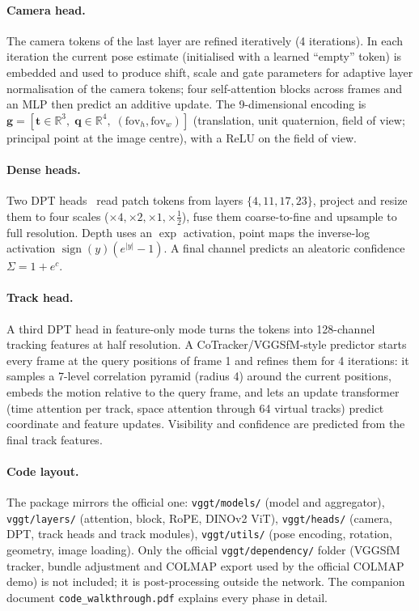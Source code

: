 \documentclass[11pt,a4paper]{article}
\begin{document}
\paragraph{Camera head.} The camera tokens of the last layer are refined iteratively (4 iterations). In each iteration the
current pose estimate (initialised with a learned ``empty'' token) is embedded and used to produce shift, scale and gate
parameters for adaptive layer normalisation of the camera tokens; four self-attention blocks across frames and an MLP
then predict an additive update. The 9-dimensional encoding is
$\mathbf{g} = [\mathbf{t}\in\mathbb{R}^3,\; \mathbf{q}\in\mathbb{R}^4,\; (\text{fov}_h, \text{fov}_w)]$ (translation,
unit quaternion, field of view; principal point at the image centre), with a ReLU on the field of view.

\paragraph{Dense heads.} Two DPT heads~\cite{dpt} read patch tokens from layers $\{4, 11, 17, 23\}$, project and resize them to
four scales ($\times4, \times2, \times1, \times\tfrac12$), fuse them coarse-to-fine and upsample to full resolution. Depth uses
an $\exp$ activation, point maps the inverse-log activation $\operatorname{sign}(y)(e^{|y|}-1)$. A final channel predicts an
aleatoric confidence $\Sigma = 1 + e^{c}$.

\paragraph{Track head.} A third DPT head in feature-only mode turns the tokens into 128-channel tracking features at half
resolution. A CoTracker/VGGSfM-style predictor starts every frame at the query positions of frame 1 and refines them for 4
iterations: it samples a 7-level correlation pyramid (radius 4) around the current positions, embeds the motion relative to
the query frame, and lets an update transformer (time attention per track, space attention through 64 virtual tracks) predict
coordinate and feature updates. Visibility and confidence are predicted from the final track features.

\paragraph{Code layout.} The package mirrors the official one: \texttt{vggt/models/} (model and aggregator),
\texttt{vggt/layers/} (attention, block, RoPE, DINOv2 ViT), \texttt{vggt/heads/} (camera, DPT, track heads and track modules),
\texttt{vggt/utils/} (pose encoding, rotation, geometry, image loading). Only the official \texttt{vggt/dependency/} folder
(VGGSfM tracker, bundle adjustment and COLMAP export used by the official COLMAP demo) is not included; it is post-processing
outside the network. The companion document \texttt{code\_walkthrough.pdf} explains every phase in detail.
\end{document}
